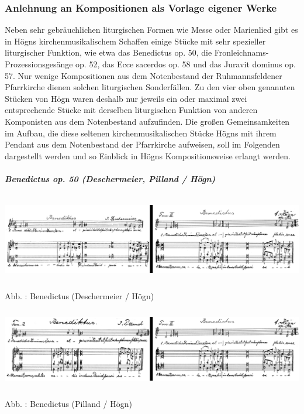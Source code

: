 \documentclass[a4paper]{article}
\newcounter{Abb}
\renewcommand\theAbb{\arabic{Abb}}
\begin{document}
\subsubsection{Anlehnung an Kompositionen als Vorlage eigener Werke}
\label{bkm:Ref96491192}\hypertarget{RefHeadingToc100333749}{}Neben sehr
gebräuchlichen liturgischen Formen wie Messe oder Marienlied gibt es in
Högns kirchenmusikalischem Schaffen einige Stücke mit sehr spezieller
liturgischer Funktion, wie etwa das Benedictus op. 50, die
Fronleichnams-Prozessionsgesänge op. 52, das Ecce sacerdos op. 58 und
das Juravit dominus op. 57. Nur wenige Kompositionen aus dem
Notenbestand der Ruhmannsfeldener Pfarrkirche dienen solchen
liturgischen Sonderfällen. Zu den vier oben genannten Stücken von Högn
waren deshalb nur jeweils ein oder maximal zwei entsprechende Stücke
mit derselben liturgischen Funktion von anderen Komponisten aus dem
Notenbestand aufzufinden. Die großen Gemeinsamkeiten im Aufbau, die
diese seltenen kirchenmusikalischen Stücke Högns mit ihrem Pendant aus
dem Notenbestand der Pfarrkirche aufweisen, soll im Folgenden
dargestellt werden und so Einblick in Högns Kompositionsweise erlangt
werden.

\subparagraph[Benedictus op. 50 (Deschermeier, Pilland /
Högn)]{Benedictus op. 50 (Deschermeier, Pilland / Högn)}

\includegraphics[width=15.977cm,height=3.671cm]{pictures/zulassungsarbeit-img080.png}


Abb. \stepcounter{Abb}{\theAbb}: Benedictus (Deschermeier / Högn)


\includegraphics[width=15.977cm,height=3.478cm]{pictures/zulassungsarbeit-img081.png}


Abb. \stepcounter{Abb}{\theAbb}: Benedictus (Pilland / Högn)
\end{document}
